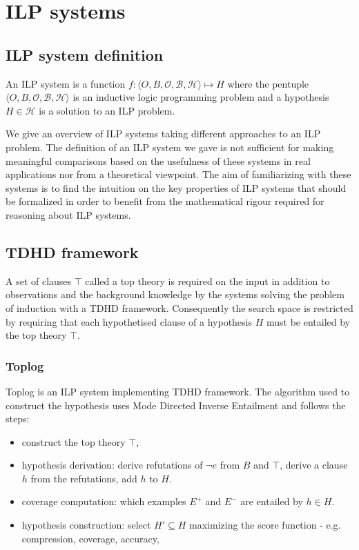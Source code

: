\section{ILP systems}

\subsection{ILP system definition}
An ILP system is a function
$f:\langle O, B, \mathcal{O}, \mathcal{B}, \mathcal{H}\rangle \mapsto H$ where the pentuple $\langle O, B, \mathcal{O}, \mathcal{B}, \mathcal{H}\rangle$
is an inductive logic programming problem and a hypothesis $H \in \mathcal{H}$ is a solution to an ILP problem.

We give an overview of ILP systems taking different approaches to an ILP problem. The definition of an ILP system we gave is not sufficient for making meaningful comparisons based on the usefulness of these systems in real applications nor from a theoretical viewpoint. The aim of familiarizing with these systems is to find the intuition on the key properties of ILP systems that should be formalized in order to benefit from the mathematical rigour required for reasoning about ILP systems.

\subsection{TDHD framework\cite{muggleton2008}}
A set of clauses $\top$ called a top theory is required on the input in addition to observations and the background knowledge by the systems solving the problem of induction with a TDHD framework. Consequently the search space is restricted by requiring that each hypothetised clause of a hypothesis $H$ must be entailed by the top theory $\top$.

\subsubsection{Toplog\cite{muggleton2008}}
Toplog is an ILP system implementing TDHD framework. The algorithm used to construct the hypothesis uses Mode Directed Inverse Entailment and follows the steps:
\begin{itemize}
\item construct the top theory $\top$,
\item hypothesis derivation: derive refutations of $\neg e$ from $B$ and $\top$, derive a clause $h$ from the refutations, add $h$ to $H$.
\item coverage computation: which examples $E^+$ and $E^-$ are entailed by $h \in H$.
\item hypothesis construction: select $H' \subseteq H$ maximizing the score function - e.g. compression, coverage, accuracy,
\end{itemize}

